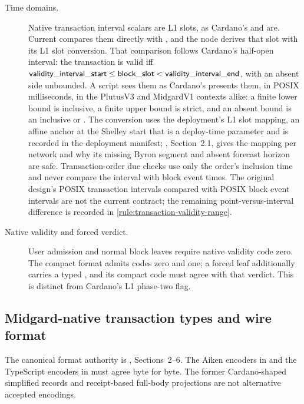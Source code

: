 \documentclass[../midgard.tex]{subfiles}
\begin{document}
\begin{description}
    \item[Time domains.] Native transaction interval scalars are L1 slots, as Cardano's  and  are.
      Current  compares them directly with , and the node derives that slot with its L1 slot conversion.
      That comparison follows Cardano's half-open interval: the transaction is valid iff $\mathsf{validity\_interval\_start} \le \mathsf{block\_slot} < \mathsf{validity\_interval\_end}$, with an absent side unbounded.
      A script sees them as Cardano's  presents them, in POSIX milliseconds, in the PlutusV3 and MidgardV1 contexts alike: a finite lower bound is inclusive, a finite upper bound is strict, and an absent bound is an inclusive  or .
      The conversion uses the deployment's L1 slot mapping, an affine anchor at the Shelley start that is a deploy-time parameter and is recorded in the deployment manifest; , Section~2.1, gives the mapping per network and why its missing Byron segment and absent forecast horizon are safe.
      Transaction-order due checks use only the order's inclusion time and never compare the interval with block event times.
      The original design's POSIX transaction intervals compared with POSIX block event intervals are not the current contract; the remaining point-versus-interval difference is recorded in \cref{rule:transaction-validity-range}.
    \item[Native validity and forced verdict.] User admission and normal block leaves require native validity code zero.
      The compact format admits codes zero and one; a forced leaf additionally carries a typed , and its compact code must agree with that verdict.
      This is distinct from Cardano's L1 phase-two  flag.
\end{description}

\subsection{Midgard-native transaction types and wire format}
\label{h:midgard-simplified-transaction-types}
\label{h:midgard-transaction-types}
\label{h:midgard-native-transaction-wire-format}

The canonical format authority is , Sections~2--6.
The Aiken encoders in  and the TypeScript encoders in  must agree byte for byte.
The former Cardano-shaped simplified records and receipt-based full-body projections are not alternative accepted encodings.
\end{document}
